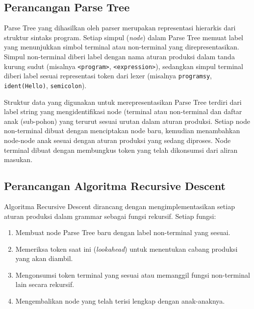 \documentclass[12pt,a4paper]{article}
\begin{document}
\subsection{Perancangan Parse Tree}

Parse Tree yang dihasilkan oleh parser merupakan representasi hierarkis dari
struktur sintaks program. Setiap simpul (\textit{node}) dalam Parse Tree memuat
label yang menunjukkan simbol terminal atau non-terminal yang direpresentasikan.
Simpul non-terminal diberi label dengan nama aturan produksi dalam tanda kurung
sudut (misalnya \texttt{<program>}, \texttt{<expression>}), sedangkan simpul
terminal diberi label sesuai representasi token dari lexer (misalnya
\texttt{programsy}, \texttt{ident(Hello)}, \texttt{semicolon}).

Struktur data yang digunakan untuk merepresentasikan Parse Tree terdiri
dari label string yang mengidentifikasi node (terminal atau non-terminal dan
daftar anak (sub-pohon) yang terurut sesuai urutan dalam aturan
produksi. Setiap node non-terminal dibuat dengan menciptakan node baru, kemudian
menambahkan node-node anak sesuai dengan aturan produksi yang sedang diproses.
Node terminal dibuat dengan membungkus token yang telah dikonsumsi dari aliran
masukan.

\subsection{Perancangan Algoritma Recursive Descent}

Algoritma Recursive Descent dirancang dengan mengimplementasikan setiap aturan produksi dalam grammar sebagai fungsi rekursif. Setiap fungsi:
\begin{enumerate}
    \item Membuat node Parse Tree baru dengan label non-terminal yang sesuai.
    \item Memeriksa token saat ini (\textit{lookahead}) untuk menentukan cabang produksi yang akan diambil.
    \item Mengonsumsi token terminal yang sesuai atau memanggil fungsi non-terminal lain secara rekursif.
    \item Mengembalikan node yang telah terisi lengkap dengan anak-anaknya.
\end{enumerate}
\end{document}

